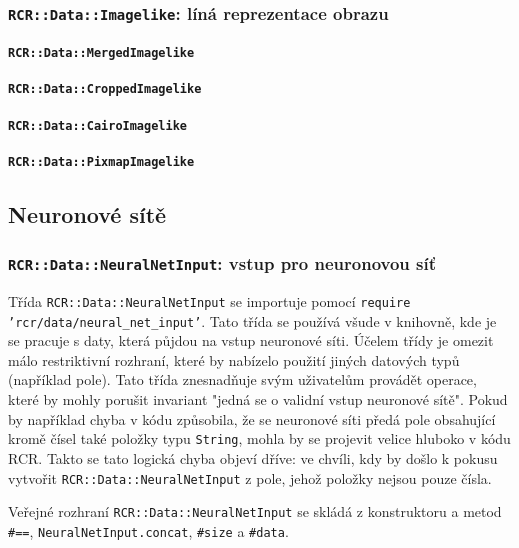 \documentclass[a4paper]{article}
\begin{document}
\subsubsection{\texttt{RCR::Data::Imagelike}: líná reprezentace obrazu}

\paragraph{\texttt{RCR::Data::MergedImagelike}}
\paragraph{\texttt{RCR::Data::CroppedImagelike}}
\paragraph{\texttt{RCR::Data::CairoImagelike}}
\paragraph{\texttt{RCR::Data::PixmapImagelike}}

\subsection{Neuronové sítě}
\subsubsection{\texttt{RCR::Data::NeuralNetInput}: vstup pro neuronovou síť}
Třída \texttt{RCR::Data::NeuralNetInput} se importuje pomocí \texttt{require
'rcr/data/neural\_net\_input'}. Tato třída se používá všude v knihovně, kde
je se pracuje s daty, která půjdou na vstup neuronové síti. Účelem třídy
je omezit málo restriktivní rozhraní, které by nabízelo použití jiných datových
typů (například pole). Tato třída znesnadňuje svým uživatelům provádět operace,
které by mohly porušit invariant "jedná se o validní vstup neuronové sítě".
Pokud by například chyba v kódu způsobila, že se neuronové síti předá pole
obsahující kromě čísel také položky typu \texttt{String}, mohla by se projevit
velice hluboko v kódu RCR. Takto se tato logická chyba objeví dříve: ve chvíli,
kdy by došlo k pokusu vytvořit \texttt{RCR::Data::NeuralNetInput} z pole,
jehož položky nejsou pouze čísla.

Veřejné rozhraní \texttt{RCR::Data::NeuralNetInput} se skládá z konstruktoru a
metod \texttt{\#==}, \texttt{NeuralNetInput.concat}, \texttt{\#size} a \texttt{\#data}.
\end{document}
